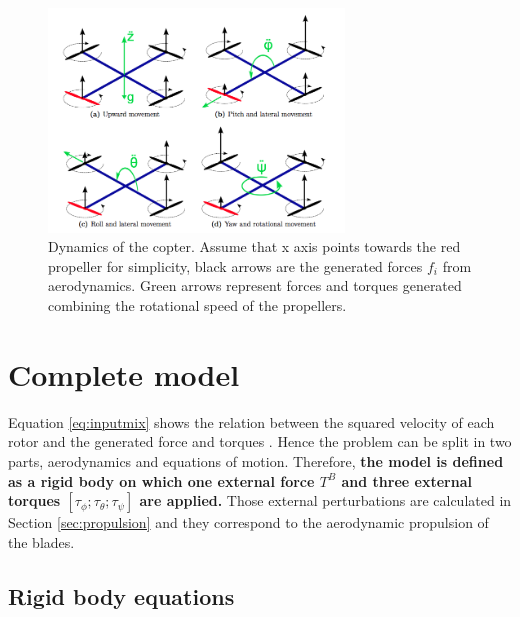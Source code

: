 \begin{figure}[h]
\centering
 \includegraphics[width=0.7\textwidth]{forces.png}
 \caption[Quad dynamics]{Dynamics of the copter. Assume that x axis points towards the red propeller for simplicity, black arrows are the generated forces $f_i$ from aerodynamics. Green arrows represent forces and torques generated combining the rotational speed of the propellers.}
 \label{figure:forces}
\end{figure}


\section{Complete model}

Equation \eqref{eq:inputmix} shows the relation between the squared velocity of each rotor and the generated force and torques  . Hence the problem can be split in two parts, aerodynamics and equations of motion. Therefore, \textbf{the model is defined as a rigid body on which one external force $T^B$ and three external torques $[\tau_\phi ; \tau_\theta ; \tau_\psi]$ are applied.} Those external perturbations are calculated in Section \ref{sec:propulsion} and they correspond to the aerodynamic propulsion of the blades. 

\subsection{Rigid body equations}

